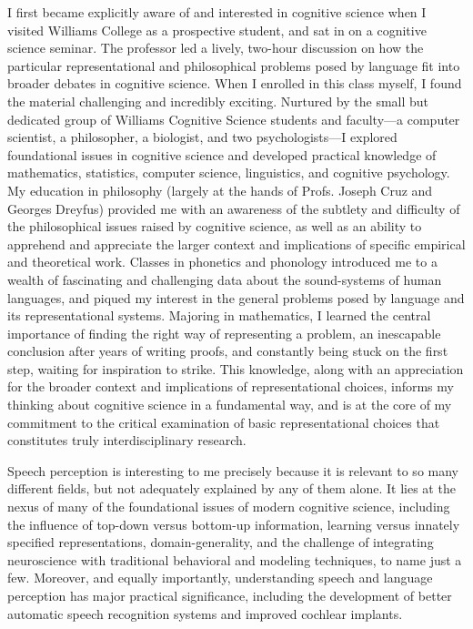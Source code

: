 \documentclass[12pt]{article}
\begin{document}



I first became explicitly aware of and interested in cognitive science when I visited Williams College as a prospective student, and sat in on a cognitive science seminar.  The professor led a lively, two-hour discussion on how the particular representational and philosophical problems posed by language fit into broader debates in cognitive science.  When I enrolled in this class myself, I found the material challenging and incredibly exciting.  Nurtured by the small but dedicated group of Williams Cognitive Science students and faculty---a computer scientist, a philosopher, a biologist, and two psychologists---I explored foundational issues in cognitive science and developed practical knowledge of mathematics, statistics, computer science, linguistics, and cognitive psychology.  My education in philosophy (largely at the hands of Profs. Joseph Cruz and Georges Dreyfus) provided me with an awareness of the subtlety and difficulty of the philosophical issues raised by cognitive science, as well as an ability to apprehend and appreciate the larger context and implications of specific empirical and theoretical work.  Classes in phonetics and phonology introduced me to a wealth of fascinating and challenging data about the sound-systems of human languages, and piqued my interest in the general problems posed by language and its representational systems.  Majoring in mathematics, I learned the central importance of finding the right way of representing a problem, an inescapable conclusion after years of writing proofs, and constantly being stuck on the first step, waiting for inspiration to strike.  This knowledge, along with an appreciation for the broader context and implications of representational choices, informs my thinking about cognitive science in a fundamental way, and is at the core of my commitment to the critical examination of basic representational choices that constitutes truly interdisciplinary research. 

Speech perception is interesting to me precisely because it is relevant to so many different fields, but not adequately explained by any of them alone.  It lies at the nexus of many of the foundational issues of modern cognitive science, including the influence of top-down versus bottom-up information, learning versus innately specified representations, domain-generality, and the challenge of integrating neuroscience with traditional behavioral and modeling techniques, to name just a few.  Moreover, and equally importantly, understanding speech and language perception has major practical significance, including the development of better automatic speech recognition systems and improved cochlear implants.
\end{document}

